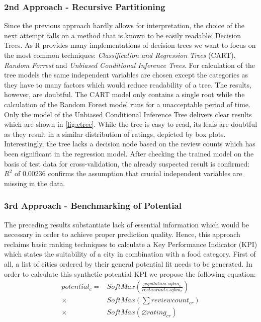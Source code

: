\subsubsection{2nd Approach - Recursive Partitioning}
Since the previous approach hardly allows for interpretation, the choice of the next attempt falls on a method that is known to be easily readable: Decision Trees. As R provides many implementations of decision trees we want to focus on the most common techniques: \textit{Classification and Regression Trees} (CART), \textit{Random Forrest} and \textit{Unbiased Conditional Inference Trees}.\newline
For calculation of the tree models the same independent variables are chosen except the categories as they have to many factors which would reduce readability of a tree. The results, however, are doubtful. The CART model only contains a single root while the calculation of the Random Forest model runs for a unacceptable period of time. Only the model of the Unbiased Conditional Inference Tree delivers clear results which are shown in \ref{fig:ctree}.
While the tree is easy to read, its leafs are doubtful as they result in a similar distribution of ratings, depicted by box plots.
Interestingly, the tree lacks a decision node based on the review counts which has been significant in the regression model.
After checking the trained model on the basis of test data for cross-validation, the already suspected result is confirmed: $R^2$ of 0.00236 confirms the assumption that crucial independent variables are missing in the data.

\subsubsection{3rd Approach - Benchmarking of Potential}
The preceding results substantiate lack of essential information which would be necessary in order to achieve proper prediction quality. Hence, this approach reclaims basic ranking techniques to calculate a Key Performance Indicator (KPI) which states the suitability of a city in combination with a food category.\newline
First of all, a list of cities ordered by their general potential fit needs to be generated. In order to calculate this synthetic potential KPI we propose the following equation:
\begin{equation}
\begin{aligned}
	potential_c = &SoftMax(\frac{population.sqkm_c}{restaurants.sqkm_c})  \\
	\times & SoftMax(\textstyle \sum reviewcount_{cr})  \\
	\times & SoftMax(\varnothing rating_{cr}) %
\end{aligned}
\label{eq:potential_benchmark}
\end{equation}

